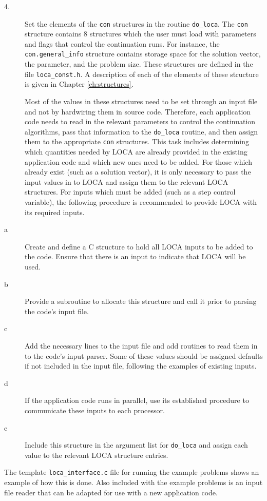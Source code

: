 \begin{description}
\item[4.] Set the elements of the \texttt{con} structures in the routine \texttt{do\_loca}. The \texttt{con} structure contains $8$ structures which the user must load with parameters and flags that control the continuation runs. For instance, the \texttt{con.general\_info} structure contains storage space for the solution vector, the parameter, and the problem size. These structures are defined in the file \texttt{loca\_const.h}. A description of each of the elements of these structure is given in Chapter \ref{ch:structures}. 

Most of the values in these structures need to be set through an input file and not by hardwiring them in source code. Therefore, each application code needs to read in the relevant parameters to control the continuation algorithms, pass that information to the \texttt{do\_loca} routine, and then assign them to the appropriate \texttt{con} structures. This task includes determining which quantities needed by LOCA are already provided in the existing application code and which new ones need to be added. For those which already exist (such as a solution vector), it is only necessary to pass the input values in to LOCA and assign them to the relevant LOCA structures. For inputs which must be added (such as a step control variable), the following procedure is recommended to provide LOCA with its required inputs. 

\end{description} 

\begin{description}

\item[a] Create and define a C structure to hold all LOCA inputs to be added to the code. Ensure that there is an input to indicate that LOCA will be used.

\item[b] Provide a subroutine to allocate this structure and call it prior to parsing the code's input file.

\item[c] Add the necessary lines to the input file and add routines to read them in to the code's input parser. Some of these values should be assigned defaults if not included in the input file, following the examples of existing inputs.

\item[d] If the application code runs in parallel, use its established procedure to communicate these inputs to each processor.

\item[e] Include this structure in the argument list for \texttt{do\_loca} and assign each value to the relevant LOCA structure entries.

\end{description}

The template \texttt{loca\_interface.c} file for running the example problems shows
an example of how this is done. Also included with the example problems is an input file reader that can be adapted for use with a new application code. 
